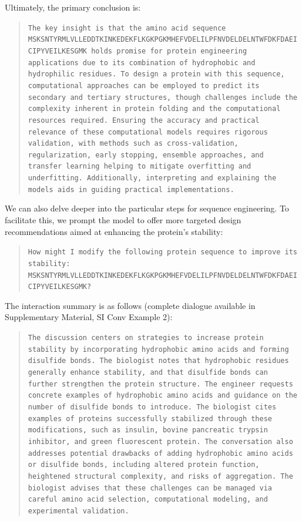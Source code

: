 Ultimately, the primary conclusion is:

\begin{quote}
\small\texttt{The key insight is that the amino acid sequence MSKSNTYRMLVLLEDDTKINKEDEKFLKGKPGKMHEFVDELILPFNVDELDELNTWFDKFDAEICIPYVEILKESGMK holds promise for protein engineering applications due to its combination of hydrophobic and hydrophilic residues. To design a protein with this sequence, computational approaches can be employed to predict its secondary and tertiary structures, though challenges include the complexity inherent in protein folding and the computational resources required. Ensuring the accuracy and practical relevance of these computational models requires rigorous validation, with methods such as cross-validation, regularization, early stopping, ensemble approaches, and transfer learning helping to mitigate overfitting and underfitting. Additionally, interpreting and explaining the models aids in guiding practical implementations.}
\end{quote}

We can also delve deeper into the particular steps for sequence engineering. To facilitate this, we prompt the model to offer more targeted design recommendations aimed at enhancing the protein’s stability:

\begin{quote}
\small\texttt{How might I modify the following protein sequence to improve its stability: MSKSNTYRMLVLLEDDTKINKEDEKFLKGKPGKMHEFVDELILPFNVDELDELNTWFDKFDAEICIPYVEILKESGMK? }
\end{quote}

The interaction summary is as follows (complete dialogue available in Supplementary Material, SI Conv Example 2):

\begin{quote}
\small\texttt{The discussion centers on strategies to increase protein stability by incorporating hydrophobic amino acids and forming disulfide bonds. The biologist notes that hydrophobic residues generally enhance stability, and that disulfide bonds can further strengthen the protein structure. The engineer requests concrete examples of hydrophobic amino acids and guidance on the number of disulfide bonds to introduce. The biologist cites examples of proteins successfully stabilized through these modifications, such as insulin, bovine pancreatic trypsin inhibitor, and green fluorescent protein. The conversation also addresses potential drawbacks of adding hydrophobic amino acids or disulfide bonds, including altered protein function, heightened structural complexity, and risks of aggregation. The biologist advises that these challenges can be managed via careful amino acid selection, computational modeling, and experimental validation.}
\end{quote}

